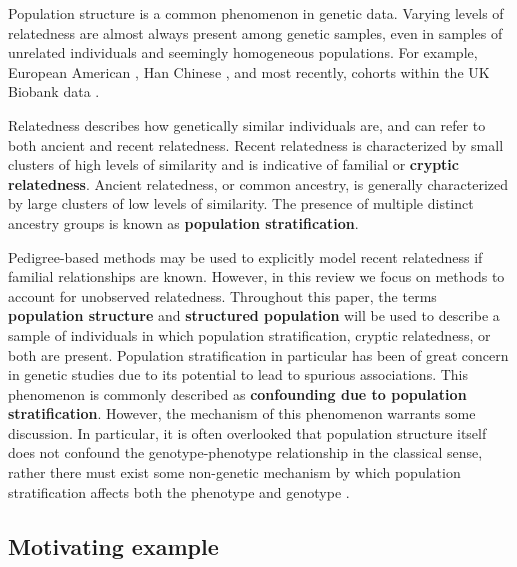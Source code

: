 Population structure is a common phenomenon in genetic data. Varying levels of relatedness are almost always present among genetic samples, even in samples of unrelated individuals and seemingly homogeneous populations. For example, European American \citep{campbell2005demonstrating}, Han Chinese \citep{xu2009genomic, chen2009genetic}, and most recently, cohorts within the UK Biobank data \citep{haworth2019apparent}.

Relatedness describes how genetically similar individuals are, and can refer to both ancient and recent relatedness.  Recent relatedness is characterized by small clusters of high levels of similarity and is indicative of familial or \textbf{cryptic relatedness}. Ancient relatedness, or common ancestry, is generally characterized by large clusters of low levels of similarity. The presence of multiple distinct ancestry groups is known as \textbf{population stratification}. 

Pedigree-based methods may be used to explicitly model recent relatedness if familial relationships are known. However, in this review we focus on methods to account for unobserved relatedness. Throughout this paper, the terms \textbf{population structure} and \textbf{structured population} will be used to describe a sample of individuals in which population stratification, cryptic relatedness, or both are present. Population stratification in particular has been of great concern in genetic studies due to its potential to lead to spurious associations. This phenomenon is commonly described as \textbf{confounding due to population stratification}. However, the mechanism of this phenomenon warrants some discussion. In particular, it is often overlooked that population structure itself does not confound the genotype-phenotype relationship in the classical sense, rather there must exist some non-genetic mechanism by which population stratification affects both the phenotype and genotype \citep{barton2019population, vilhjalmsson2012nature}. \\



\subsection{Motivating example}

